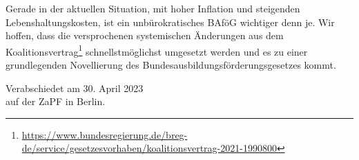 \documentclass[DIV=calc]{scrartcl}
\begin{document}
Gerade in der aktuellen Situation, mit hoher Inflation und steigenden Lebenshaltungskosten, ist ein unbürokratisches BAföG wichtiger denn je.
Wir hoffen, dass die versprochenen systemischen Änderungen aus dem Koalitionsvertrag\footnote{\url{https://www.bundesregierung.de/breg-de/service/gesetzesvorhaben/koalitionsvertrag-2021-1990800}} schnellstmöglichst umgesetzt werden und es zu einer grundlegenden Novellierung des Bundesausbildungsförderungsgesetzes kommt. 



\vspace{1cm} 

\vfill
\begin{flushright}
	Verabschiedet am 30. April 2023 \\
	auf der ZaPF in Berlin.
\end{flushright}
\end{document}
